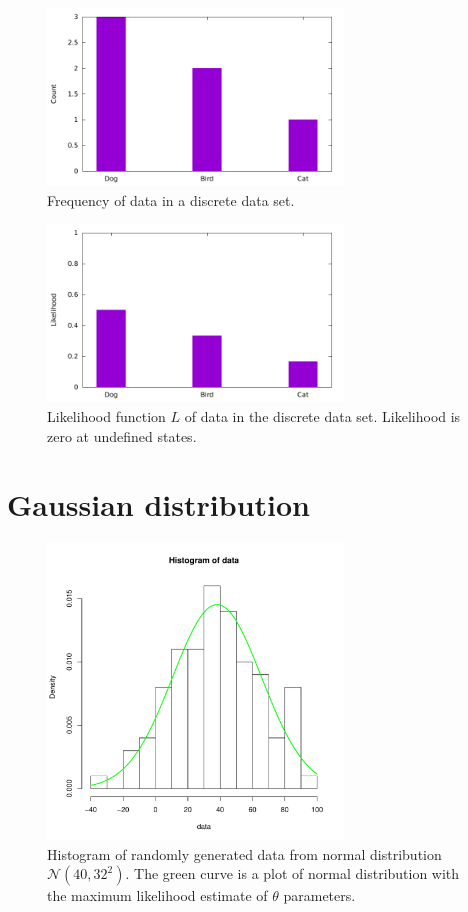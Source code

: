 \documentclass[thesis=B,english]{FITthesis}[2012/06/26]
\begin{document}
\begin{figure}
	\centering
 	\includegraphics[width=0.7\textwidth]{discrete_mle_hist}
 	\caption{Frequency of data in a discrete data set.}
 	\label{fig:discrete_mle_hist}
\end{figure}

\begin{figure}
	\centering
 	\includegraphics[width=0.7\textwidth]{discrete_mle_prob}
 	\caption{Likelihood function $L$ of data in the discrete data set. Likelihood is zero at undefined states.}
 	\label{fig:discrete_mle_prob}
\end{figure}

\section{Gaussian distribution}

\begin{figure}
	\centering
 	\includegraphics[width=0.7\textwidth]{normal_mle}
 	\caption{Histogram of randomly generated data from normal distribution $\mathcal{N}(40,32^2)$. The green curve is a plot of normal distribution with the maximum likelihood estimate of $\theta$ parameters.}
 	\label{fig:normal_mle}
\end{figure}
\end{document}

